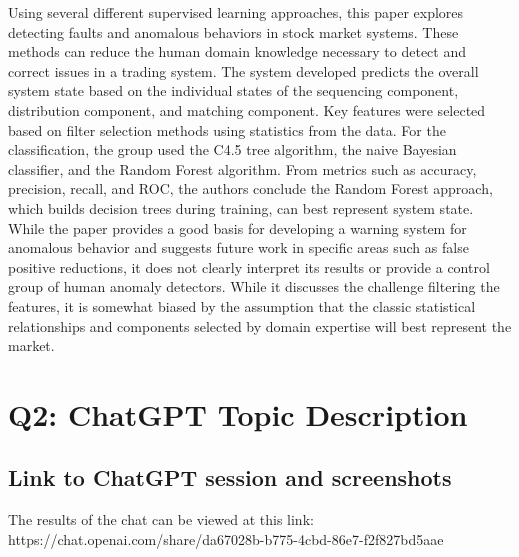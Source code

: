 \documentclass[12pt]{article}
\begin{document}
Using several different supervised learning approaches, this paper explores detecting faults and anomalous behaviors in stock market systems. These methods can reduce the human domain knowledge necessary to detect and correct issues in a trading system. The system developed predicts the overall system state based on the individual states of the sequencing component, distribution component, and matching component. Key features were selected based on filter selection methods using statistics from the data. For the classification, the group used the C4.5 tree algorithm, the naive Bayesian classifier, and the Random Forest algorithm. From metrics such as accuracy, precision, recall, and ROC, the authors conclude the Random Forest approach, which builds decision trees during training, can best represent system state. While the paper provides a good basis for developing a warning system for anomalous behavior and suggests future work in specific areas such as false positive reductions, it does not clearly interpret its results or provide a control group of human anomaly detectors. While it discusses the challenge filtering the features, it is somewhat biased by the assumption that the classic statistical relationships and components selected by domain expertise will best represent the market.



\section{Q2: ChatGPT Topic Description}
\subsection{Link to ChatGPT session and screenshots}
The results of the chat can be viewed at this link:
https://chat.openai.com/share/da67028b-b775-4cbd-86e7-f2f827bd5aae
\end{document}
